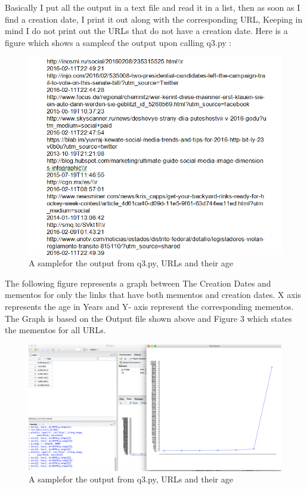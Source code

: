 \documentclass{article}
\begin{document}
Basically I put all the output in a text file and read it in a list, then as soon as I find a creation date, I print it out along with the corresponding URL, Keeping in mind I do not print out the URLs that do not have a creation date. Here is a figure which shows a sampleof the output upon calling q3.py :
\begin{figure}
\centering
\includegraphics[scale=0.75]{q3fig.png}
\caption{A samplefor the output from q3.py, URLs and their age}
\label{fig:q3fig.png}
\end{figure}

The following figure represents a graph between The Creation Dates and mementos for only the links that have both mementos and creation dates. X axis represents the age in Years and Y- axis represent the corresponding mementos. The Graph is based on  the Output file shown above and Figure 3 which states the mementos for all URLs.

\begin{figure}
\centering
\includegraphics[scale=0.15]{graph.png}
\caption{A samplefor the output from q3.py, URLs and their age}
\label{fig:graph.png}
\end{figure}
\end{document}
